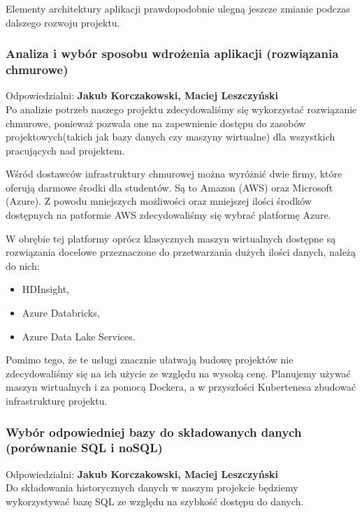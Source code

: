 \documentclass[a4paper,11pt, notitlepage ]{article}
\begin{document}
    Elementy architektury aplikacji prawdopodobnie ulegną jeszcze zmianie podczas dalszego rozwoju projektu.
    \subsubsection{Analiza i wybór sposobu wdrożenia aplikacji (rozwiązania chmurowe)} 
    Odpowiedzialni: \textbf{Jakub Korczakowski, Maciej Leszczyński}\\
    Po analizie potrzeb naszego projektu zdecydowaliśmy się wykorzystać rozwiązanie chmurowe, ponieważ pozwala one na zapewnienie dostępu do zasobów projektowych(takich jak bazy danych czy maszyny wirtualne) dla wszystkich pracujących nad projektem.
    
    Wśród dostawców infrastruktury chmurowej można wyróżnić dwie firmy, które oferują darmowe środki dla studentów. Są to Amazon (AWS) oraz Microsoft (Azure). Z powodu mniejszych możliwości oraz mniejszej ilości środków dostępnych na patformie AWS zdecydowaliśmy się wybrać platformę Azure.
    
    W obrębie tej platformy oprócz klasycznych maszyn wirtualnych dostępne są rozwiązania docelowe przeznaczone do przetwarzania dużych ilości danych, należą do nich:
    \begin{itemize}
        \item HDInsight,
        \item Azure Databricks,
        \item Azure Data Lake Services.
    \end{itemize}
    
    Pomimo tego, że te usługi znacznie ułatwają budowę projektów nie zdecydowaliśmy się na ich użycie ze względu na wysoką cenę. Planujemy używać maszyn wirtualnych i za pomocą Dockera, a w przyszłości Kubertenesa zbudować infrastrukturę projektu.
    \subsubsection{Wybór odpowiedniej bazy do składowanych danych (porównanie SQL i noSQL)} 
    Odpowiedzialni: \textbf{Jakub Korczakowski, Maciej Leszczyński}\\
    Do składowania historycznych danych w naszym projekcie będziemy wykorzystywać bazę SQL ze względu na szybkość dostępu do danych.
\end{document}
